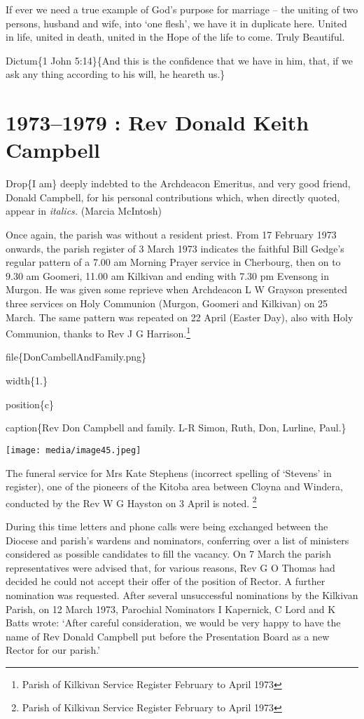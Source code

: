 If ever we need a true example of God's purpose for marriage -- the uniting of two persons, husband and wife, into `one flesh', we have it in duplicate here. United in life, united in death, united in the Hope of the life to come. Truly Beautiful.

Dictum\{1 John 5:14\}\{And this is the confidence that we have in him, that, if we ask any thing according to his will, he heareth us.\}

\hypertarget{rev-donald-keith-campbell}{%
\chapter{1973--1979 : Rev Donald Keith Campbell}\label{rev-donald-keith-campbell}}

Drop\{I am\} deeply indebted to the Archdeacon Emeritus, and very good friend, Donald Campbell, for his personal contributions which, when directly quoted, appear in \emph{italics.} (Marcia McIntosh)

Once again, the parish was without a resident priest. From 17 February 1973 onwards, the parish register of 3 March 1973 indicates the faithful Bill Gedge's regular pattern of a 7.00 am Morning Prayer service in Cherbourg, then on to 9.30 am Goomeri, 11.00 am Kilkivan and ending with 7.30 pm Evensong in Murgon. He was given some reprieve when Archdeacon L W Grayson presented three services on Holy Communion (Murgon, Goomeri and Kilkivan) on 25 March. The same pattern was repeated on 22 April (Easter Day), also with Holy Communion, thanks to Rev J G Harrison.\footnote{Parish of Kilkivan Service Register February to April 1973}

file\{DonCambellAndFamily.png\}

width\{1.\}

position\{c\}

caption\{Rev Don Campbell and family. L-R Simon, Ruth, Don, Lurline, Paul.\}

\texttt{[image: media/image45.jpeg]}

The funeral service for Mrs Kate Stephens (incorrect spelling of `Stevens' in register), one of the pioneers of the Kitoba area between Cloyna and Windera, conducted by the Rev W G Hayston on 3 April is noted. \footnote{Parish of Kilkivan Service Register February to April 1973}

During this time letters and phone calls were being exchanged between the Diocese and parish's wardens and nominators, conferring over a list of ministers considered as possible candidates to fill the vacancy. On 7 March the parish representatives were advised that, for various reasons, Rev G O Thomas had decided he could not accept their offer of the position of Rector. A further nomination was requested. After several unsuccessful nominations by the Kilkivan Parish, on 12 March 1973, Parochial Nominators I Kapernick, C Lord and K Batts wrote: `After careful consideration, we would be very happy to have the name of Rev Donald Campbell put before the Presentation Board as a new Rector for our parish.'

